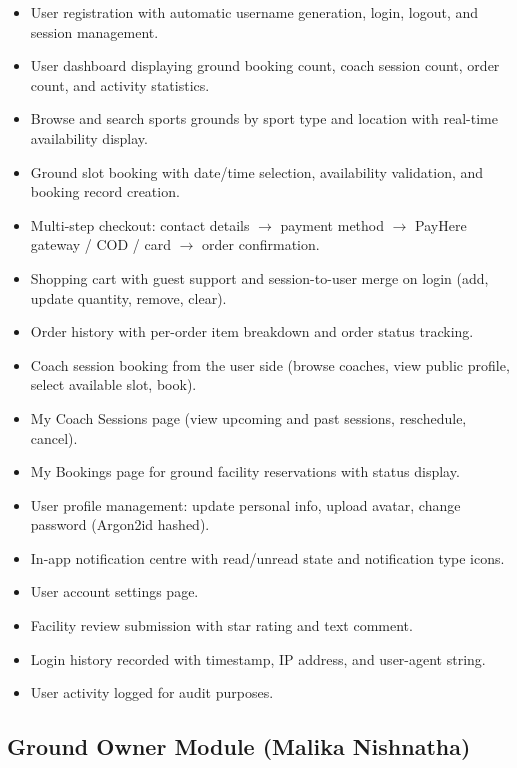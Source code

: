 \documentclass[12pt,a4paper]{report}
\begin{document}
\begin{itemize}[leftmargin=1.5cm]
  \item User registration with automatic username generation, login, logout, and session management.
  \item User dashboard displaying ground booking count, coach session count, order count, and activity statistics.
  \item Browse and search sports grounds by sport type and location with real-time availability display.
  \item Ground slot booking with date/time selection, availability validation, and booking record creation.
  \item Multi-step checkout: contact details $\to$ payment method $\to$ PayHere gateway / COD / card $\to$ order confirmation.
  \item Shopping cart with guest support and session-to-user merge on login (add, update quantity, remove, clear).
  \item Order history with per-order item breakdown and order status tracking.
  \item Coach session booking from the user side (browse coaches, view public profile, select available slot, book).
  \item My Coach Sessions page (view upcoming and past sessions, reschedule, cancel).
  \item My Bookings page for ground facility reservations with status display.
  \item User profile management: update personal info, upload avatar, change password (Argon2id hashed).
  \item In-app notification centre with read/unread state and notification type icons.
  \item User account settings page.
  \item Facility review submission with star rating and text comment.
  \item Login history recorded with timestamp, IP address, and user-agent string.
  \item User activity logged for audit purposes.
\end{itemize}

\subsection{Ground Owner Module (Malika Nishnatha)}
\end{document}
